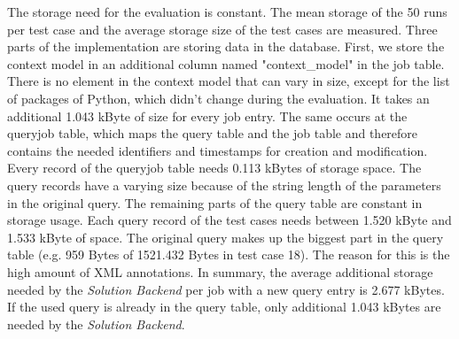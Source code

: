 \documentclass[draft,final]{vutinfth} %
\begin{document}
The storage need for the evaluation is constant. The mean storage of the 50 runs per test case and the average storage size of the test cases are measured. Three parts of the implementation are storing data in the database. First, we store the context model in an additional column named "context\_model" in the job table. There is no element in the context model that can vary in size, except for the list of packages of Python, which didn't change during the evaluation. It takes an additional 1.043 kByte of size for every job entry. The same occurs at the queryjob table, which maps the query table and the job table and therefore contains the needed identifiers and timestamps for creation and modification. Every record of the queryjob table needs 0.113 kBytes of storage space.
The query records have a varying size because of the string length of the parameters in the original query. The remaining parts of the query table are constant in storage usage. Each query record of the test cases needs between 1.520 kByte and 1.533 kByte of space. The original query makes up the biggest part in the query table (e.g. 959 Bytes of 1521.432 Bytes in test case 18). The reason for this is the high amount of XML annotations. In summary, the average additional storage needed by the \textit{Solution Backend} per job with a new query entry is 2.677 kBytes. If the used query is already in the query table, only additional 1.043 kBytes are needed by the \textit{Solution Backend}.
\newpage
\end{document}
